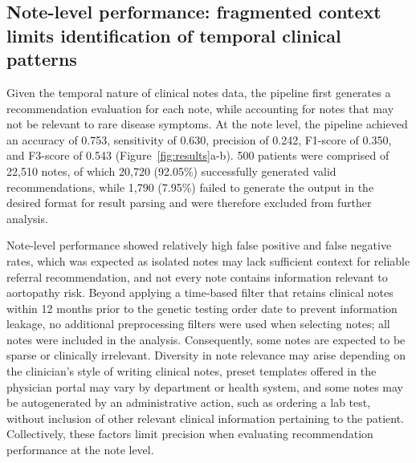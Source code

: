 \documentclass[fleqn,10pt]{wlscirep}
\begin{document}
\subsection*{Note-level performance: fragmented context limits identification of temporal clinical patterns}
Given the temporal nature of clinical notes data, the pipeline first generates a recommendation evaluation for each note, while accounting for notes that may not be relevant to rare disease symptoms. At the note level, the pipeline achieved an accuracy of 0.753, sensitivity of 0.630, precision of 0.242, F1-score of 0.350, and F3-score of 0.543 (Figure~\ref{fig:results}a-b). 500 patients were comprised of 22,510 notes, of which 20,720 (92.05\%) successfully generated valid recommendations, while 1,790 (7.95\%) failed to generate the output in the desired format for result parsing and were therefore excluded from further analysis. 

Note-level performance showed relatively high false positive and false negative rates, which was expected as isolated notes may lack sufficient context for reliable referral recommendation, and not every note contains information relevant to aortopathy risk. Beyond applying a time-based filter that retains clinical notes within 12 months prior to the genetic testing order date to prevent information leakage, no additional preprocessing filters were used when selecting notes; all notes were included in the analysis. Consequently, some notes are expected to be sparse or clinically irrelevant. Diversity in note relevance may arise depending on the clinician’s style of writing clinical notes, preset templates offered in the physician portal may vary by department or health system, and some notes may be autogenerated by an administrative action, such as ordering a lab test, without inclusion of other relevant clinical information pertaining to the patient. Collectively, these factors limit precision when evaluating recommendation performance at the note level.
\end{document}
